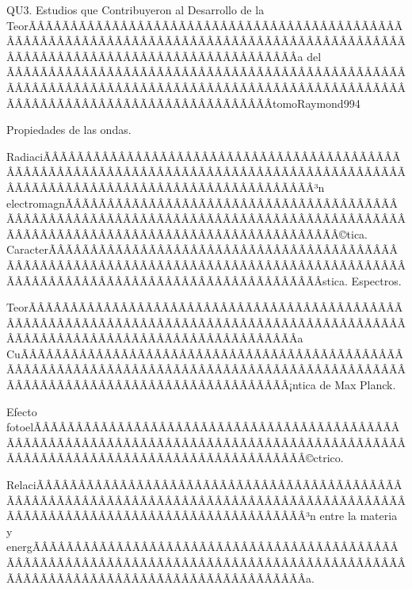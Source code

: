 \begin{sumilla}
\begin{unit}{QU3. Estudios que Contribuyeron al Desarrollo de la TeorÃÂÃÂÃÂÃÂÃÂÃÂÃÂÃÂÃÂÃÂÃÂÃÂÃÂÃÂÃÂÃÂÃÂÃÂÃÂÃÂÃÂÃÂÃÂÃÂÃÂÃÂÃÂÃÂÃÂÃÂÃÂÃÂÃÂÃÂÃÂÃÂÃÂÃÂÃÂÃÂÃÂÃÂÃÂÃÂÃÂÃÂÃÂÃÂÃÂÃÂÃÂÃÂÃÂÃÂÃÂÃÂÃÂÃÂÃÂÃÂÃÂÃÂÃÂÃÂ­a del ÃÂÃÂÃÂÃÂÃÂÃÂÃÂÃÂÃÂÃÂÃÂÃÂÃÂÃÂÃÂÃÂÃÂÃÂÃÂÃÂÃÂÃÂÃÂÃÂÃÂÃÂÃÂÃÂÃÂÃÂÃÂÃÂÃÂÃÂÃÂÃÂÃÂÃÂÃÂÃÂÃÂÃÂÃÂÃÂÃÂÃÂÃÂÃÂÃÂÃÂÃÂÃÂÃÂÃÂÃÂÃÂÃÂÃÂÃÂÃÂÃÂÃÂÃÂÃÂtomo}{Raymond99}{4}
\begin{topicos}
      \item Propiedades de las ondas.
      \item RadiaciÃÂÃÂÃÂÃÂÃÂÃÂÃÂÃÂÃÂÃÂÃÂÃÂÃÂÃÂÃÂÃÂÃÂÃÂÃÂÃÂÃÂÃÂÃÂÃÂÃÂÃÂÃÂÃÂÃÂÃÂÃÂÃÂÃÂÃÂÃÂÃÂÃÂÃÂÃÂÃÂÃÂÃÂÃÂÃÂÃÂÃÂÃÂÃÂÃÂÃÂÃÂÃÂÃÂÃÂÃÂÃÂÃÂÃÂÃÂÃÂÃÂÃÂÃÂÃÂ³n electromagnÃÂÃÂÃÂÃÂÃÂÃÂÃÂÃÂÃÂÃÂÃÂÃÂÃÂÃÂÃÂÃÂÃÂÃÂÃÂÃÂÃÂÃÂÃÂÃÂÃÂÃÂÃÂÃÂÃÂÃÂÃÂÃÂÃÂÃÂÃÂÃÂÃÂÃÂÃÂÃÂÃÂÃÂÃÂÃÂÃÂÃÂÃÂÃÂÃÂÃÂÃÂÃÂÃÂÃÂÃÂÃÂÃÂÃÂÃÂÃÂÃÂÃÂÃÂÃÂ©tica. CaracterÃÂÃÂÃÂÃÂÃÂÃÂÃÂÃÂÃÂÃÂÃÂÃÂÃÂÃÂÃÂÃÂÃÂÃÂÃÂÃÂÃÂÃÂÃÂÃÂÃÂÃÂÃÂÃÂÃÂÃÂÃÂÃÂÃÂÃÂÃÂÃÂÃÂÃÂÃÂÃÂÃÂÃÂÃÂÃÂÃÂÃÂÃÂÃÂÃÂÃÂÃÂÃÂÃÂÃÂÃÂÃÂÃÂÃÂÃÂÃÂÃÂÃÂÃÂÃÂ­stica. Espectros.
      \item TeorÃÂÃÂÃÂÃÂÃÂÃÂÃÂÃÂÃÂÃÂÃÂÃÂÃÂÃÂÃÂÃÂÃÂÃÂÃÂÃÂÃÂÃÂÃÂÃÂÃÂÃÂÃÂÃÂÃÂÃÂÃÂÃÂÃÂÃÂÃÂÃÂÃÂÃÂÃÂÃÂÃÂÃÂÃÂÃÂÃÂÃÂÃÂÃÂÃÂÃÂÃÂÃÂÃÂÃÂÃÂÃÂÃÂÃÂÃÂÃÂÃÂÃÂÃÂÃÂ­a CuÃÂÃÂÃÂÃÂÃÂÃÂÃÂÃÂÃÂÃÂÃÂÃÂÃÂÃÂÃÂÃÂÃÂÃÂÃÂÃÂÃÂÃÂÃÂÃÂÃÂÃÂÃÂÃÂÃÂÃÂÃÂÃÂÃÂÃÂÃÂÃÂÃÂÃÂÃÂÃÂÃÂÃÂÃÂÃÂÃÂÃÂÃÂÃÂÃÂÃÂÃÂÃÂÃÂÃÂÃÂÃÂÃÂÃÂÃÂÃÂÃÂÃÂÃÂÃÂ¡ntica de Max Planck.
      \item Efecto fotoelÃÂÃÂÃÂÃÂÃÂÃÂÃÂÃÂÃÂÃÂÃÂÃÂÃÂÃÂÃÂÃÂÃÂÃÂÃÂÃÂÃÂÃÂÃÂÃÂÃÂÃÂÃÂÃÂÃÂÃÂÃÂÃÂÃÂÃÂÃÂÃÂÃÂÃÂÃÂÃÂÃÂÃÂÃÂÃÂÃÂÃÂÃÂÃÂÃÂÃÂÃÂÃÂÃÂÃÂÃÂÃÂÃÂÃÂÃÂÃÂÃÂÃÂÃÂÃÂ©ctrico.
      \item RelaciÃÂÃÂÃÂÃÂÃÂÃÂÃÂÃÂÃÂÃÂÃÂÃÂÃÂÃÂÃÂÃÂÃÂÃÂÃÂÃÂÃÂÃÂÃÂÃÂÃÂÃÂÃÂÃÂÃÂÃÂÃÂÃÂÃÂÃÂÃÂÃÂÃÂÃÂÃÂÃÂÃÂÃÂÃÂÃÂÃÂÃÂÃÂÃÂÃÂÃÂÃÂÃÂÃÂÃÂÃÂÃÂÃÂÃÂÃÂÃÂÃÂÃÂÃÂÃÂ³n entre la materia y energÃÂÃÂÃÂÃÂÃÂÃÂÃÂÃÂÃÂÃÂÃÂÃÂÃÂÃÂÃÂÃÂÃÂÃÂÃÂÃÂÃÂÃÂÃÂÃÂÃÂÃÂÃÂÃÂÃÂÃÂÃÂÃÂÃÂÃÂÃÂÃÂÃÂÃÂÃÂÃÂÃÂÃÂÃÂÃÂÃÂÃÂÃÂÃÂÃÂÃÂÃÂÃÂÃÂÃÂÃÂÃÂÃÂÃÂÃÂÃÂÃÂÃÂÃÂÃÂ­a.

\end{topicos}
\end{unit}
\end{sumilla}
